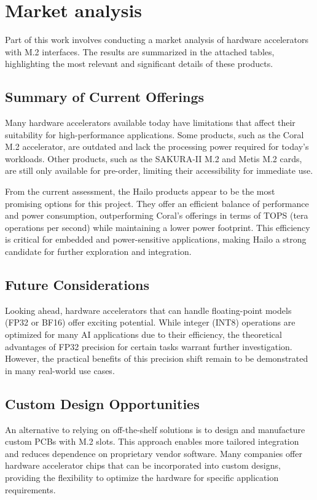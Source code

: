 \chapter{Market analysis}

Part of this work involves conducting a market analysis of hardware accelerators with M.2 interfaces. 
The results are summarized in the attached tables, highlighting the most relevant and significant details of these products.

\section{Summary of Current Offerings}
Many hardware accelerators available today have limitations that affect their suitability for high-performance applications.
Some products, such as the Coral M.2 accelerator, are outdated and lack the processing power required for today's workloads.
Other products, such as the SAKURA-II M.2 and Metis M.2 cards, are still only available for pre-order, limiting their accessibility for immediate use.

From the current assessment, the Hailo products appear to be the most promising options for this project.
They offer an efficient balance of performance and power consumption, outperforming Coral's offerings in terms of TOPS (tera operations per second) while maintaining a lower power footprint.
This efficiency is critical for embedded and power-sensitive applications, making Hailo a strong candidate for further exploration and integration.

\section{Future Considerations}
Looking ahead, hardware accelerators that can handle floating-point models (FP32 or BF16) offer exciting potential.
While integer (INT8) operations are optimized for many AI applications due to their efficiency, the theoretical advantages of FP32 precision for certain tasks warrant further investigation.
However, the practical benefits of this precision shift remain to be demonstrated in many real-world use cases.


\section{Custom Design Opportunities}
An alternative to relying on off-the-shelf solutions is to design and manufacture custom PCBs with M.2 slots.
This approach enables more tailored integration and reduces dependence on proprietary vendor software. 
Many companies offer hardware accelerator chips that can be incorporated into custom designs, providing the flexibility to optimize the hardware for specific application requirements.


